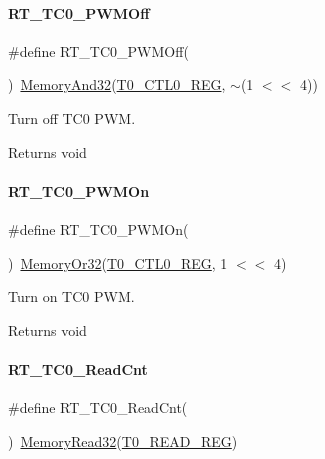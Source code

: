 \paragraph{\texorpdfstring{R\+T\+\_\+\+T\+C0\+\_\+\+P\+W\+M\+Off}{RT\_TC0\_PWMOff}}
{\footnotesize\ttfamily \#define R\+T\+\_\+\+T\+C0\+\_\+\+P\+W\+M\+Off(\begin{DoxyParamCaption}{ }\end{DoxyParamCaption})~\mbox{\hyperlink{a00026_ad87cedffcaadc51db22594fce55173d4}{Memory\+And32}}(\mbox{\hyperlink{a00026_ac94b0659ef32086a6752672082c0b3ed}{T0\+\_\+\+C\+T\+L0\+\_\+\+R\+EG}}, $\sim$(1 $<$$<$ 4))}



Turn off T\+C0 P\+WM. 

\begin{DoxyReturn}{Returns}
void 
\end{DoxyReturn}
\mbox{\label{a00077_a70e69675d0a4e7d5095f938dffa14779}} 
\paragraph{\texorpdfstring{R\+T\+\_\+\+T\+C0\+\_\+\+P\+W\+M\+On}{RT\_TC0\_PWMOn}}
{\footnotesize\ttfamily \#define R\+T\+\_\+\+T\+C0\+\_\+\+P\+W\+M\+On(\begin{DoxyParamCaption}{ }\end{DoxyParamCaption})~\mbox{\hyperlink{a00026_a27874a97deab7cecdde5ddecf466e31e}{Memory\+Or32}}(\mbox{\hyperlink{a00026_ac94b0659ef32086a6752672082c0b3ed}{T0\+\_\+\+C\+T\+L0\+\_\+\+R\+EG}}, 1 $<$$<$ 4)}



Turn on T\+C0 P\+WM. 

\begin{DoxyReturn}{Returns}
void 
\end{DoxyReturn}
\mbox{\label{a00077_acd97abf7aebb4ffa83af031604a67344}} 
\paragraph{\texorpdfstring{R\+T\+\_\+\+T\+C0\+\_\+\+Read\+Cnt}{RT\_TC0\_ReadCnt}}
{\footnotesize\ttfamily \#define R\+T\+\_\+\+T\+C0\+\_\+\+Read\+Cnt(\begin{DoxyParamCaption}{ }\end{DoxyParamCaption})~\mbox{\hyperlink{a00026_a2d484dc15bdf30ee11ab3b05f31f0e16}{Memory\+Read32}}(\mbox{\hyperlink{a00026_a277152b8a3150eb5ae1201205e2778fb}{T0\+\_\+\+R\+E\+A\+D\+\_\+\+R\+EG}})}



